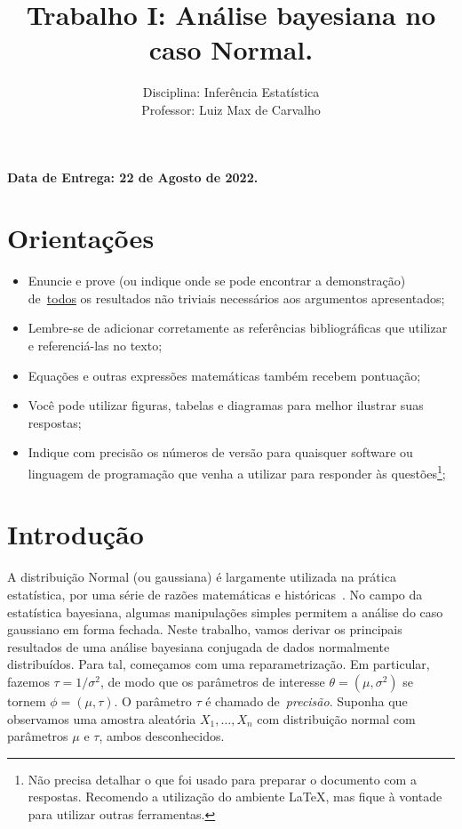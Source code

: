 \documentclass[a4paper,10pt, notitlepage]{report}
\title{Trabalho I: Análise bayesiana no caso Normal.}
\author{Disciplina: Inferência Estatística \\ Professor: Luiz Max de Carvalho}
\begin{document}
\maketitle

\textbf{Data de Entrega: 22 de Agosto de 2022.}

\section*{Orientações}
\begin{itemize}
 \item Enuncie e prove (ou indique onde se pode encontrar a demonstração) de~\underline{todos} os resultados não triviais necessários aos argumentos apresentados;
 \item Lembre-se de adicionar corretamente as referências bibliográficas que utilizar e referenciá-las no texto;
 \item Equações e outras expressões matemáticas também recebem pontuação;
 \item Você pode utilizar figuras, tabelas e diagramas para melhor ilustrar suas respostas;
 \item Indique com precisão os números de versão para quaisquer software ou linguagem de programação que venha a utilizar para responder às questões\footnote{Não precisa detalhar o que foi usado para preparar o documento com a respostas. Recomendo a utilização do ambiente LaTeX, mas fique à vontade para utilizar outras ferramentas.};
 \end{itemize}


\section*{Introdução}

A distribuição Normal (ou gaussiana) é largamente utilizada na prática estatística, por uma série de razões matemáticas e históricas~\citep{Kim2008}.
No campo da estatística bayesiana, algumas manipulações simples permitem a análise do caso gaussiano em forma fechada.
Neste trabalho, vamos derivar os principais resultados de uma análise bayesiana conjugada de dados normalmente distribuídos.
Para tal, começamos com uma reparametrização.
Em particular, fazemos $\tau = 1/\sigma^2$, de modo que os parâmetros de interesse $\theta = (\mu, \sigma^2)$ se tornem $\phi = (\mu, \tau)$.
O parâmetro $\tau$ é chamado de~\textit{precisão}.
Suponha que observamos uma amostra aleatória $X_1, \ldots, X_n$ com distribuição normal com parâmetros $\mu$ e $\tau$, ambos desconhecidos.
\end{document}
